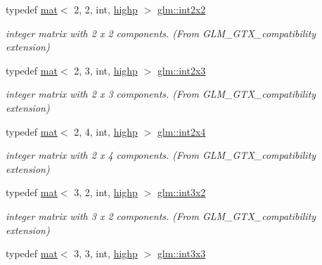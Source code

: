 \begin{DoxyCompactItemize}
typedef \mbox{\hyperlink{structglm_1_1mat}{mat}}$<$ 2, 2, int, \mbox{\hyperlink{namespaceglm_a36ed105b07c7746804d7fdc7cc90ff25ac6f7eab42eacbb10d59a58e95e362074}{highp}} $>$ \mbox{\hyperlink{group__gtx__compatibility_ga8884c82366cc406dd20e00b78969d001}{glm\+::int2x2}}
\begin{DoxyCompactList}\small\item\em integer matrix with 2 x 2 components. (From G\+L\+M\+\_\+\+G\+T\+X\+\_\+compatibility extension) \end{DoxyCompactList}\item 
typedef \mbox{\hyperlink{structglm_1_1mat}{mat}}$<$ 2, 3, int, \mbox{\hyperlink{namespaceglm_a36ed105b07c7746804d7fdc7cc90ff25ac6f7eab42eacbb10d59a58e95e362074}{highp}} $>$ \mbox{\hyperlink{group__gtx__compatibility_ga13c7e3ba6d19765d8877cccf05c2e520}{glm\+::int2x3}}
\begin{DoxyCompactList}\small\item\em integer matrix with 2 x 3 components. (From G\+L\+M\+\_\+\+G\+T\+X\+\_\+compatibility extension) \end{DoxyCompactList}\item 
typedef \mbox{\hyperlink{structglm_1_1mat}{mat}}$<$ 2, 4, int, \mbox{\hyperlink{namespaceglm_a36ed105b07c7746804d7fdc7cc90ff25ac6f7eab42eacbb10d59a58e95e362074}{highp}} $>$ \mbox{\hyperlink{group__gtx__compatibility_gab5fea62bdc861a2b0dd5ae6147b88975}{glm\+::int2x4}}
\begin{DoxyCompactList}\small\item\em integer matrix with 2 x 4 components. (From G\+L\+M\+\_\+\+G\+T\+X\+\_\+compatibility extension) \end{DoxyCompactList}\item 
typedef \mbox{\hyperlink{structglm_1_1mat}{mat}}$<$ 3, 2, int, \mbox{\hyperlink{namespaceglm_a36ed105b07c7746804d7fdc7cc90ff25ac6f7eab42eacbb10d59a58e95e362074}{highp}} $>$ \mbox{\hyperlink{group__gtx__compatibility_ga3e01f29f95467e49bdfd1b000420d13e}{glm\+::int3x2}}
\begin{DoxyCompactList}\small\item\em integer matrix with 3 x 2 components. (From G\+L\+M\+\_\+\+G\+T\+X\+\_\+compatibility extension) \end{DoxyCompactList}\item 
typedef \mbox{\hyperlink{structglm_1_1mat}{mat}}$<$ 3, 3, int, \mbox{\hyperlink{namespaceglm_a36ed105b07c7746804d7fdc7cc90ff25ac6f7eab42eacbb10d59a58e95e362074}{highp}} $>$ \mbox{\hyperlink{group__gtx__compatibility_gac7c574e682731013783283d875602224}{glm\+::int3x3}}

\end{DoxyCompactItemize}
